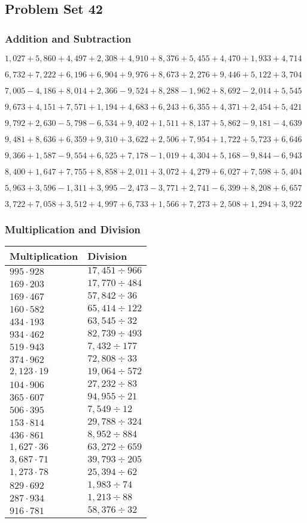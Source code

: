 \hypertarget{problem-set-42-2}{%
\subsection{Problem Set 42}\label{problem-set-42-2}}

\hypertarget{addition-and-subtraction-204}{%
\subsubsection{Addition and
Subtraction}\label{addition-and-subtraction-204}}

\(1,027+5,860+4,497+2,308+4,910+8,376+5,455+4,470+1,933+ 4,714\)

\(6,732+7,222+6,196+6,904+9,976+8,673+2,276+9,446+5,122+3,704\)

\(7,005-4,186+8,014+2,366-9,524+8,288-1,962+8,692-2,014+5,545\)

\(9,673+4,151+7,571+1,194+4,683+6,243+6,355+4,371+2,454+5,421\)

\(9,792+2,630-5,798-6,534+9,402+1,511+8,137+5,862-9,181-4,639\)

\(9,481+8,636+6,359+9,310+3,622+2,506+7,954+1,722+5,723+6,646\)

\(9,366+1,587-9,554+6,525+7,178-1,019+4,304+5,168-9,844-6,943\)

\(8,400+1,647+7,755+8,858+2,011+3,072+4,279+6,027+7,598+5,404\)

\(5,963+3,596-1,311+3,995-2,473-3,771+2,741-6,399+8,208+6,657\)

\(3,722+7,058+3,512+4,997+6,733+1,566+7,273+2,508+1,294+3,922\)

\hypertarget{multiplication-and-division-203}{%
\subsubsection{Multiplication and
Division}\label{multiplication-and-division-203}}

\begin{longtable}[]{@{}ll@{}}
\toprule
Multiplication & Division\tabularnewline
\midrule
\endhead
\(995\cdot928\) & \(17,451÷966\)\tabularnewline
\(169\cdot203\) & \(17,770÷484\)\tabularnewline
\(169\cdot467\) & \(57,842÷36\)\tabularnewline
\(160\cdot582\) & \(65,414÷122\)\tabularnewline
\(434\cdot193\) & \(63,545÷32\)\tabularnewline
\(934\cdot462\) & \(82,739÷493\)\tabularnewline
\(519\cdot943\) & \(7,432÷177\)\tabularnewline
\(374\cdot962\) & \(72,808÷33\)\tabularnewline
\(2,123\cdot19\) & \(19,064÷572\)\tabularnewline
\(104\cdot906\) & \(27,232÷83\)\tabularnewline
\(365\cdot607\) & \(94,955÷21\)\tabularnewline
\(506\cdot395\) & \(7,549÷12\)\tabularnewline
\(153\cdot814\) & \(29,788÷324\)\tabularnewline
\(436\cdot861\) & \(8,952÷884\)\tabularnewline
\(1,627\cdot36\) & \(63,272÷659\)\tabularnewline
\(3,687\cdot71\) & \(39,793÷205\)\tabularnewline
\(1,273\cdot78\) & \(25,394÷62\)\tabularnewline
\(829\cdot692\) & \(1,983÷74\)\tabularnewline
\(287\cdot934\) & \(1,213÷88\)\tabularnewline
\(916\cdot781\) & \(58,376÷32\)\tabularnewline
\bottomrule
\end{longtable}

